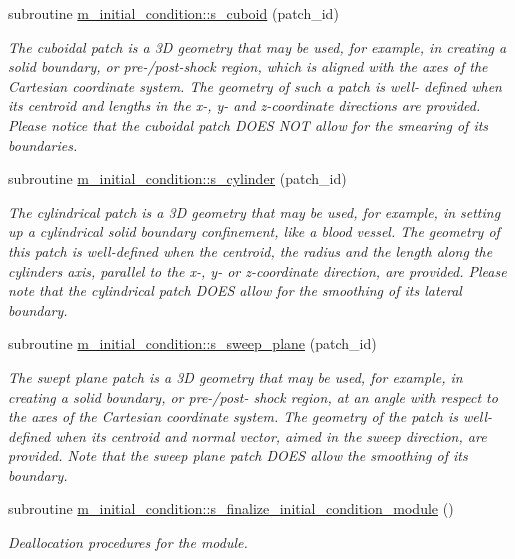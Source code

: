 \begin{DoxyCompactItemize}
subroutine \hyperlink{namespacem__initial__condition_a2297a9b98d2478b3594083197bd9b8b5}{m\+\_\+initial\+\_\+condition\+::s\+\_\+cuboid} (patch\+\_\+id)
\begin{DoxyCompactList}\small\item\em The cuboidal patch is a 3D geometry that may be used, for example, in creating a solid boundary, or pre-\//post-\/shock region, which is aligned with the axes of the Cartesian coordinate system. The geometry of such a patch is well-\/ defined when its centroid and lengths in the x-\/, y-\/ and z-\/coordinate directions are provided. Please notice that the cuboidal patch D\+O\+ES N\+OT allow for the smearing of its boundaries. \end{DoxyCompactList}\item 
subroutine \hyperlink{namespacem__initial__condition_af834c631376de6906fb6b002df70ce49}{m\+\_\+initial\+\_\+condition\+::s\+\_\+cylinder} (patch\+\_\+id)
\begin{DoxyCompactList}\small\item\em The cylindrical patch is a 3D geometry that may be used, for example, in setting up a cylindrical solid boundary confinement, like a blood vessel. The geometry of this patch is well-\/defined when the centroid, the radius and the length along the cylinder\textquotesingle{}s axis, parallel to the x-\/, y-\/ or z-\/coordinate direction, are provided. Please note that the cylindrical patch D\+O\+ES allow for the smoothing of its lateral boundary. \end{DoxyCompactList}\item 
subroutine \hyperlink{namespacem__initial__condition_a51f30d0a86584bdc757c22ebf7993e88}{m\+\_\+initial\+\_\+condition\+::s\+\_\+sweep\+\_\+plane} (patch\+\_\+id)
\begin{DoxyCompactList}\small\item\em The swept plane patch is a 3D geometry that may be used, for example, in creating a solid boundary, or pre-\//post-\/ shock region, at an angle with respect to the axes of the Cartesian coordinate system. The geometry of the patch is well-\/defined when its centroid and normal vector, aimed in the sweep direction, are provided. Note that the sweep plane patch D\+O\+ES allow the smoothing of its boundary. \end{DoxyCompactList}\item 
subroutine \hyperlink{namespacem__initial__condition_a944c63abd61afab021ab664246f80495}{m\+\_\+initial\+\_\+condition\+::s\+\_\+finalize\+\_\+initial\+\_\+condition\+\_\+module} ()
\begin{DoxyCompactList}\small\item\em Deallocation procedures for the module. \end{DoxyCompactList}\end{DoxyCompactItemize}
